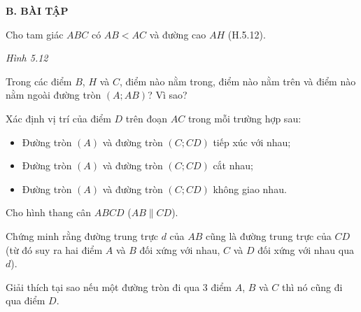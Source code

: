 \begin{practice}
    \textbf{B. BÀI TẬP}

    \begin{questions}[resume=SBT]
        \item Cho tam giác $ABC$ có $AB<AC$ và đường cao $AH$ (H.5.12).

        \begin{center}

            \textit{Hình 5.12}
        \end{center}

        \begin{questions}
            \item Trong các điểm $B$, $H$ và $C$, điểm nào nằm trong, điểm nào nằm trên và điểm nào nằm ngoài đường tròn $(A;AB)$? Vì sao?
            \item Xác định vị trí của điểm $D$ trên đoạn $AC$ trong mỗi trường hợp sau:
            \begin{itemize}
                \item Đường tròn $(A)$ và đường tròn $(C;CD)$ tiếp xúc với nhau;
                \item Đường tròn $(A)$ và đường tròn $(C;CD)$ cắt nhau;
                \item Đường tròn $(A)$ và đường tròn $(C;CD)$ không giao nhau.
            \end{itemize}
        \end{questions}
        \answerline
        \answerline
        \answerline

        \item Cho hình thang cân $ABCD$ ($AB\parallel CD$).
        \begin{questions}
            \item Chứng minh rằng đường trung trực $d$ của $AB$ cũng là đường trung trực của $CD$ (từ đó suy ra hai điểm $A$ và $B$ đối xứng với nhau, $C$ và $D$ đối xứng với nhau qua $d$).
            \item Giải thích tại sao nếu một đường tròn đi qua 3 điểm $A$, $B$ và $C$ thì nó cũng đi qua điểm $D$.
        \end{questions}
        \answerline
        \answerline


\end{questions}
\end{practice}
